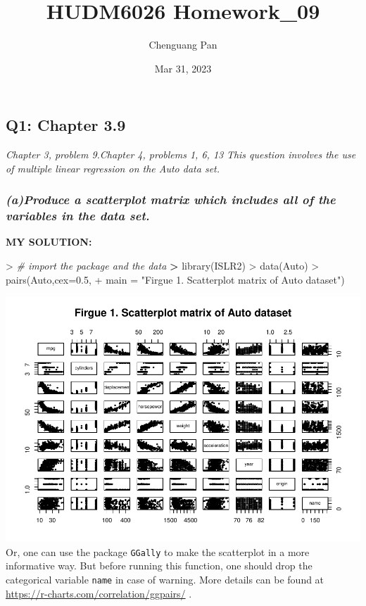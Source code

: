 \documentclass[
]{article}
\title{HUDM6026 Homework\_09}
\author{Chenguang Pan}
\date{Mar 31, 2023}
\newenvironment{Shaded}{\begin{snugshade}}{\end{snugshade}}
\newcommand{\AttributeTok}[1]{\textcolor[rgb]{0.77,0.63,0.00}{#1}}
\newcommand{\CommentTok}[1]{\textcolor[rgb]{0.56,0.35,0.01}{\textit{#1}}}
\newcommand{\ErrorTok}[1]{\textcolor[rgb]{0.64,0.00,0.00}{\textbf{#1}}}
\newcommand{\FloatTok}[1]{\textcolor[rgb]{0.00,0.00,0.81}{#1}}
\newcommand{\FunctionTok}[1]{\textcolor[rgb]{0.00,0.00,0.00}{#1}}
\newcommand{\NormalTok}[1]{#1}
\newcommand{\SpecialCharTok}[1]{\textcolor[rgb]{0.00,0.00,0.00}{#1}}
\newcommand{\StringTok}[1]{\textcolor[rgb]{0.31,0.60,0.02}{#1}}
\begin{document}
\maketitle

\hypertarget{q1-chapter-3.9}{%
\subsection{Q1: Chapter 3.9}\label{q1-chapter-3.9}}

\emph{Chapter 3, problem 9.Chapter 4, problems 1, 6, 13} \emph{This
question involves the use of multiple linear regression on the Auto data
set.}

\hypertarget{aproduce-a-scatterplot-matrix-which-includes-all-of-the-variables-in-the-data-set.}{%
\subsubsection{\texorpdfstring{\emph{(a)Produce a scatterplot matrix
which includes all of the variables in the data
set.}}{(a)Produce a scatterplot matrix which includes all of the variables in the data set.}}\label{aproduce-a-scatterplot-matrix-which-includes-all-of-the-variables-in-the-data-set.}}

\textbf{MY SOLUTION:}

\begin{Shaded}
\begin{Highlighting}[]
\SpecialCharTok{\textgreater{}} \CommentTok{\# import the package and the data}
\ErrorTok{\textgreater{}} \FunctionTok{library}\NormalTok{(ISLR2)}
\SpecialCharTok{\textgreater{}} \FunctionTok{data}\NormalTok{(Auto)}
\SpecialCharTok{\textgreater{}} \FunctionTok{pairs}\NormalTok{(Auto,}\AttributeTok{cex=}\FloatTok{0.5}\NormalTok{,}
\SpecialCharTok{+}       \AttributeTok{main =} \StringTok{"Firgue 1. Scatterplot matrix of Auto dataset"}\NormalTok{)}
\end{Highlighting}
\end{Shaded}

\includegraphics{Homework_09_new_Pan_files/figure-latex/unnamed-chunk-1-1.pdf}
Or, one can use the package \texttt{GGally} to make the scatterplot in a
more informative way. But before running this function, one should drop
the categorical variable \texttt{name} in case of warning. More details
can be found at \url{https://r-charts.com/correlation/ggpairs/} .
\end{document}

